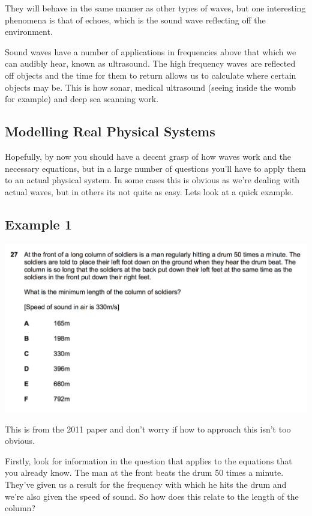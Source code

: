 \documentclass[11pt, titlepage]{article}
\begin{document}
They will behave in the same manner as other types of waves, but one interesting phenomena is that of echoes, which is the sound wave reflecting off the environment.

Sound waves have a number of applications in frequencies above that which we can audibly hear, known as ultrasound.  The high frequency waves are reflected off objects and the time for them to return allows us to calculate where certain objects may be.  This is how sonar, medical ultrasound (seeing inside the womb for example) and deep sea scanning work.


\subsection{Modelling Real Physical Systems}
Hopefully, by now you should have a decent grasp of how waves work and the necessary equations, but in a large number of questions you'll have to apply them to an actual physical system.  In some cases this is obvious as we're dealing with actual waves, but in others its not quite as easy.  Lets look at a quick example. 

\subsection*{Example 1}

\includegraphics[width=\textwidth]{2011q27}

This is from the 2011 paper and don't worry if how to approach this isn't too obvious.  

Firstly, look for information in the question that applies to the equations that you already know.  The man at the front beats the drum 50 times a minute.  They've given us a result for the frequency with which he hits the drum and we're also given the speed of sound.  So how does this relate to the length of the column?
\end{document}
